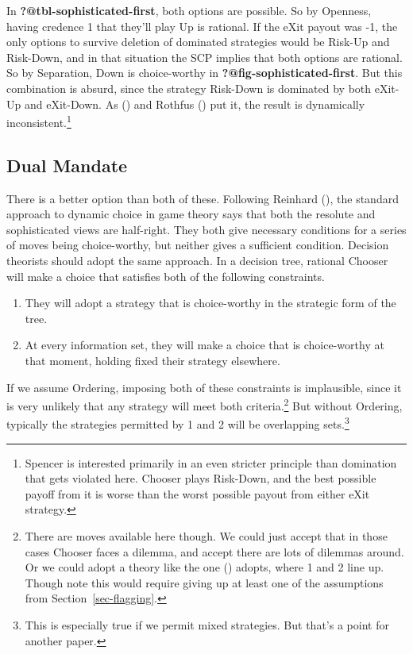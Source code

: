 \documentclass[
  10pt,
  letterpaper,
  DIV=11,
  numbers=noendperiod,
  twoside]{scrartcl}
\providecommand{\tightlist}{%
  \setlength{\itemsep}{0pt}\setlength{\parskip}{0pt}}\usepackage{longtable,booktabs,array}
\begin{document}
In \textbf{?@tbl-sophisticated-first}, both options are possible. So by
Openness, having credence 1 that they'll play Up is rational. If the
eXit payout was -1, the only options to survive deletion of dominated
strategies would be Risk-Up and Risk-Down, and in that situation the SCP
implies that both options are rational. So by Separation, Down is
choice-worthy in \textbf{?@fig-sophisticated-first}. But this
combination is absurd, since the strategy Risk-Down is dominated by both
eXit-Up and eXit-Down. As
() and Rothfus
() put it, the result is
dynamically inconsistent.\footnote{Spencer is interested primarily in an
  even stricter principle than domination that gets violated here.
  Chooser plays Risk-Down, and the best possible payoff from it is worse
  than the worst possible payout from either eXit strategy.}

\subsection{Dual Mandate}\label{sec-dual-mandate-defined}

There is a better option than both of these. Following Reinhard
(), the standard approach
to dynamic choice in game theory says that both the resolute and
sophisticated views are half-right. They both give necessary conditions
for a series of moves being choice-worthy, but neither gives a
sufficient condition. Decision theorists should adopt the same approach.
In a decision tree, rational Chooser will make a choice that satisfies
both of the following constraints.

\begin{enumerate}
\def\labelenumi{\arabic{enumi}.}
\tightlist
\item
  They will adopt a strategy that is choice-worthy in the strategic form
  of the tree.
\item
  At every information set, they will make a choice that is
  choice-worthy at that moment, holding fixed their strategy elsewhere.
\end{enumerate}

If we assume Ordering, imposing both of these constraints is
implausible, since it is very unlikely that any strategy will meet both
criteria.\footnote{There are moves available here though. We could just
  accept that in those cases Chooser faces a dilemma, and accept there
  are lots of dilemmas around. Or we could adopt a theory like the one
  () adopts, where
  1 and 2 line up. Though note this would require giving up at least one
  of the assumptions from Section~\ref{sec-flagging}.} But without
Ordering, typically the strategies permitted by 1 and 2 will be
overlapping sets.\footnote{This is especially true if we permit mixed
  strategies. But that's a point for another paper.}
\end{document}
